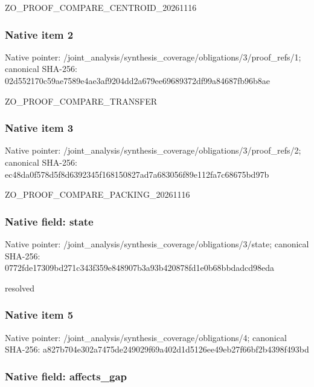 \documentclass[10pt,a4paper]{article}
\begin{document}
ZO\_PROOF\_COMPARE\_CENTROID\_20261116


\subsubsection{Native item 2}


Native pointer: /joint\_analysis/synthesi\allowbreak{}s\_coverage/obligations/3\allowbreak{}/proof\_refs/1; canonical SHA-256: 02d552170c59ae7589e4ae3a\allowbreak{}f9204dd2a679ee69689372df\allowbreak{}99a84687fb96b8ae


ZO\_PROOF\_COMPARE\_TRANSFER


\subsubsection{Native item 3}


Native pointer: /joint\_analysis/synthesi\allowbreak{}s\_coverage/obligations/3\allowbreak{}/proof\_refs/2; canonical SHA-256: ec48da0f578d5f8d6392345f\allowbreak{}168150827ad7a683056f89e1\allowbreak{}12fa7c68675bd97b


ZO\_PROOF\_COMPARE\_PACKING\_20261116


\subsubsection{Native field: state}


Native pointer: /joint\_analysis/synthesi\allowbreak{}s\_coverage/obligations/3\allowbreak{}/state; canonical SHA-256: 0772fde17309bd271c343f35\allowbreak{}9e848907b3a93b420878fd1e\allowbreak{}0b68bbdadcd98eda


resolved


\subsubsection{Native item 5}


Native pointer: /joint\_analysis/synthesi\allowbreak{}s\_coverage/obligations/4; canonical SHA-256: a827b704e302a7475de24902\allowbreak{}9f69a402d1d5126ee49eb27f\allowbreak{}66bf2b4398f493bd



\subsubsection{Native field: affects\_gap}
\end{document}
